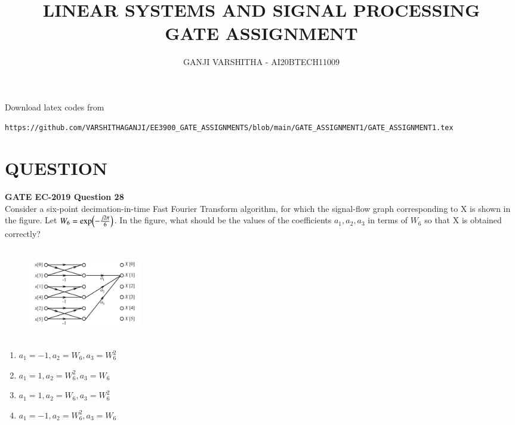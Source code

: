\documentclass[journal,12pt,twocolumn]{IEEEtran}
\begin{document}
\let\vec\mathbf
\renewcommand{\thefigure}{\theproblem}
\def\putbox#1#2#3{\makebox[0in][l]{\makebox[#1][l]{}\raisebox{\baselineskip}[0in][0in]{\raisebox{#2}[0in][0in]{#3}}}}
     \def\rightbox#1{\makebox[0in][r]{#1}}
     \def\centbox#1{\makebox[0in]{#1}}
     \def\topbox#1{\raisebox{-\baselineskip}[0in][0in]{#1}}
     \def\midbox#1{\raisebox{-0.5\baselineskip}[0in][0in]{#1}}
\vspace{3cm}
\title{\textbf{LINEAR SYSTEMS AND SIGNAL PROCESSING \\ GATE ASSIGNMENT}}
\author{GANJI VARSHITHA - AI20BTECH11009}
\maketitle
\newpage
\bigskip
\renewcommand{\thefigure}{\arabic{figure}}
\renewcommand{\thetable}{\arabic{table}}
Download latex codes from 
%
\begin{lstlisting}
https://github.com/VARSHITHAGANJI/EE3900_GATE_ASSIGNMENTS/blob/main/GATE_ASSIGNMENT1/GATE_ASSIGNMENT1.tex
\end{lstlisting}
\section*{QUESTION}
\textbf{GATE EC-2019 Question 28}
\\
Consider a six-point decimation-in-time Fast Fourier Transform  algorithm, for which the signal-flow graph corresponding to X is shown in the figure. Let $W_{6}=\text{exp\ensuremath{\left(-\frac{j2\pi}{6}\right)}}$. In the figure, what should be the values of the coefficients $a_{1}, a_{2}, a_{3}$ in terms of $W_{6}$ so that X is obtained correctly?
\begin{figure}[h]
\includegraphics[width=5cm, height=4cm]{gateq1}
\centering
\end{figure}
\begin{enumerate}
   \item  $a_{1}=-1, a_{2}=W_{6}, a_{3}=W_{6}^{2}$ 
   \item  $a_{1}=1, a_{2}=W_{6}^{2}, a_{3}=W_{6}$ 
   \item  $a_{1}=1, a_{2}=W_{6}, a_{3}=W_{6}^{2}$ 
   \item  $a_{1}=-1, a_{2}=W_{6}^{2}, a_{3}=W_{6}$ 
   
\end{enumerate}
\end{document}

